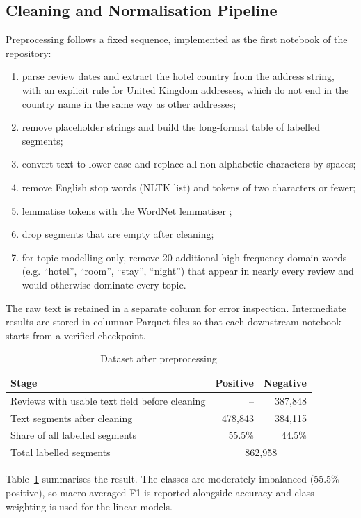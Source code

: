 \documentclass[11pt,journal,draftclsnofoot,onecolumn]{IEEEtran}
\begin{document}
\subsection{Cleaning and Normalisation Pipeline}
Preprocessing follows a fixed sequence, implemented as the first notebook of the repository:
\begin{enumerate}
\item parse review dates and extract the hotel country from the address string, with an explicit rule for United Kingdom addresses, which do not end in the country name in the same way as other addresses;
\item remove placeholder strings and build the long-format table of labelled segments;
\item convert text to lower case and replace all non-alphabetic characters by spaces;
\item remove English stop words (NLTK list) and tokens of two characters or fewer;
\item lemmatise tokens with the WordNet lemmatiser \cite{bird2009};
\item drop segments that are empty after cleaning;
\item for topic modelling only, remove 20 additional high-frequency domain words (e.g. ``hotel'', ``room'', ``stay'', ``night'') that appear in nearly every review and would otherwise dominate every topic.
\end{enumerate}
The raw text is retained in a separate column for error inspection. Intermediate results are stored in columnar Parquet files so that each downstream notebook starts from a verified checkpoint.

\begin{table}[!t]
\caption{Dataset after preprocessing}
\label{tab:data}
\centering
\begin{tabular}{lrr}
\toprule
Stage & Positive & Negative \\
\midrule
Reviews with usable text field before cleaning & -- & 387,848 \\
Text segments after cleaning & 478,843 & 384,115 \\
Share of all labelled segments & 55.5\% & 44.5\% \\
\midrule
Total labelled segments & \multicolumn{2}{c}{862,958} \\
\bottomrule
\end{tabular}
\end{table}

Table~\ref{tab:data} summarises the result. The classes are moderately imbalanced (55.5\% positive), so macro-averaged F1 is reported alongside accuracy and class weighting is used for the linear models.
\end{document}
